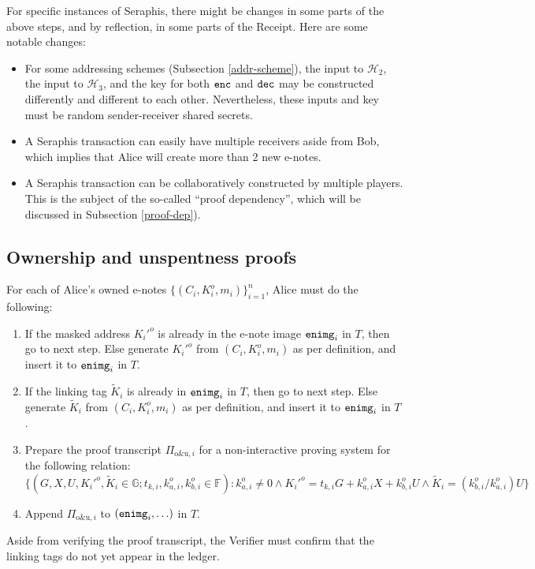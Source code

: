 \documentclass{article}
\begin{document}
For specific instances of Seraphis, there might be changes in some parts of the above steps, and by reflection, in some parts of the Receipt. Here are some notable changes:
\begin{itemize}
\item For some addressing schemes (Subsection \ref{addr-scheme}), the input to $\mathcal{H}_2$, the input to $\mathcal{H}_3$, and the key for both ${\tt enc}$ and ${\tt dec}$ may be constructed differently and different to each other. Nevertheless, these inputs and key must be random sender-receiver shared secrets.
\item A Seraphis transaction can easily have multiple receivers aside from Bob, which implies that Alice will create more than 2 new e-notes. %
\item A Seraphis transaction can be collaboratively constructed by multiple players. This is the subject of the so-called ``proof dependency'', which will be discussed in Subsection \ref{proof-dep}). %
\end{itemize}

\subsection{Ownership and unspentness proofs}\label{own-unsp}
For each of Alice's owned e-notes $\{(C_i,K_i^o,m_i)\}_{i=1}^n$, Alice must do the following:
\begin{enumerate}
    \item If the masked address $K_i'^o$ is already in the e-note image ${\tt enimg}_i$ in $T$, then go to next step. Else generate $K_i'^o$ from $(C_i, K_i^o, m_i)$ as per definition, and insert it to ${\tt enimg}_i$ in $T$.
    \item If the linking tag $\tilde{K}_i$ is already in ${\tt enimg}_i$ in $T$, then go to next step. Else generate $\tilde{K}_i$ from $(C_i, K_i^o, m_i)$ as per definition, and insert it to ${\tt enimg}_i$ in $T$.
    \item Prepare the proof transcript $\Pi_{\text{o\&u}, i}$ for a non-interactive proving system for the following relation:
$$\{(G, X, U, K_i'^o, \tilde{K}_i\in\mathbb{G}; t_{k,i}, k_{a,i}^o, k_{b,i}^o\in\mathbb{F}): k_{a,i}^o \ne 0 \wedge K_i'^o = t_{k,i} G + k_{a,i}^o X + k_{b,i}^o U \wedge \tilde{K}_i = (k_{b,i}^o/k_{a,i}^o)U \}$$
    \item Append $\Pi_{\text{o\&u}, i}$ to $({\tt enimg}_i, \ldots)$ in $T$.
\end{enumerate}
Aside from verifying the proof transcript, the Verifier must confirm that the linking tags do not yet appear in the ledger.
\end{document}
